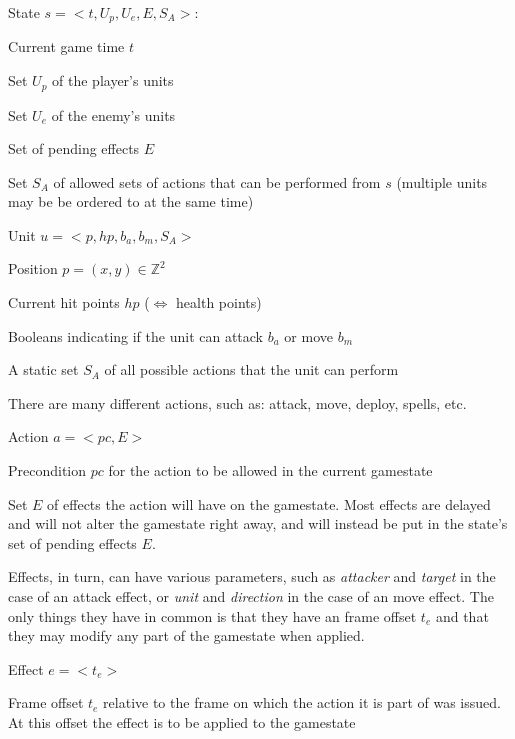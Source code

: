 \begin{descri}
\item[State] $s=<t,U_p,U_e,E,S_A>$:
\begin{shortitem}
\item Current game time $t$
\item Set $U_p$ of the player's units
\item Set $U_e$ of the enemy's units
\item Set of pending effects $E$
\item Set $S_A$ of allowed sets of actions that can be performed from $s$ (multiple units may be be ordered to at the same time)
\end{shortitem}

\item[Unit] $u = <p,hp,b_a,b_m,S_A>$
\begin{shortitem}
\item Position $p = (x,y) \in \mathbb{Z}^2$
\item Current hit points $hp$ ($\Leftrightarrow$ health points)
\item Booleans indicating if the unit can attack $b_a$ or move $b_m$
\item A static set $S_A$ of all possible actions that the unit can perform
\end{shortitem}

There are many different actions, such as: attack, move, deploy, spells, etc.
\item[Action] $a=<pc,E>$
\begin{shortitem}
\item Precondition $pc$ for the action to be allowed in the current gamestate
\item Set $E$ of effects the action will have on the gamestate.
	Most effects are delayed and will not alter the gamestate right away, and will instead be put in the state's set of pending effects $E$.
\end{shortitem}

Effects, in turn, can have various parameters, such as \emph{attacker} and \emph{target} in the case of an attack effect, or \emph{unit} and \emph{direction} in the case of an move effect.
The only things they have in common is that they have an frame offset $t_e$ and that they may modify any part of the gamestate when applied.
\item[Effect] $e=<t_e>$
\begin{shortitem}
\item Frame offset $t_e$ relative to the frame on which the action it is part of was issued. At this offset the effect is to be applied to the gamestate
\end{shortitem}
\end{descri}

